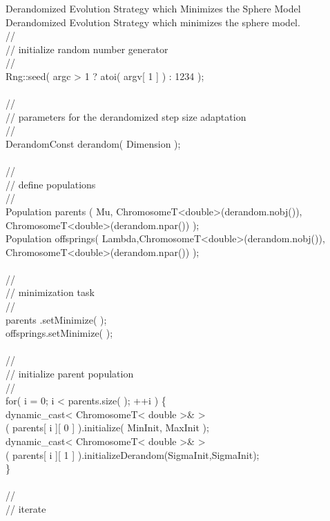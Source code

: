 \begin{programlisting}{Derandomized Evolution Strategy which Minimizes the Sphere Model}{
    Derandomized Evolution Strategy which minimizes the
    sphere model.}
\\
    //\\
    // initialize random number generator\\
    //\\
    Rng::seed( argc > 1 ? atoi( argv[ 1 ] ) : 1234 );\\
\\
    //\\
    // parameters for the derandomized step size adaptation\\
    //\\
    DerandomConst derandom( Dimension );\\
\\
    //\\
    // define populations\\
    //\\
    Population parents   ( Mu,    ChromosomeT<double>(derandom.nobj()),\\
                                  ChromosomeT<double>(derandom.npar()) );\\
    Population offsprings( Lambda,ChromosomeT<double>(derandom.nobj()),\\
                                  ChromosomeT<double>(derandom.npar()) );\\
\\
    //\\
    // minimization task\\
    //\\
    parents   .setMinimize( );\\
    offsprings.setMinimize( );\\
\\
    //\\
    // initialize parent population\\
    //\\
    for( i = 0; i < parents.size( ); ++i ) \{\\
        dynamic_cast< ChromosomeT< double >& >\\
            ( parents[ i ][ 0 ] ).initialize( MinInit, MaxInit );\\
        dynamic_cast< ChromosomeT< double >& >\\
            ( parents[ i ][ 1 ] ).initializeDerandom(SigmaInit,SigmaInit);\hspace*{-10ex}\\
    \}\\
\\
    //\\
    // iterate\\

\end{programlisting}
